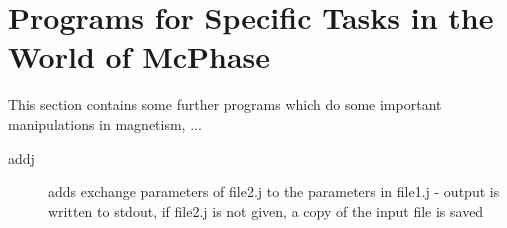 \section{Programs for Specific Tasks in the World of McPhase}\label{addprog}

This section  contains some further programs which do some important manipulations
in magnetism, ...
\begin{description} 
\item [{\prg addj}\label{addj} \addcontentsline{toc}{subsubsection}{\prg addj}
file1.j file2.j:]adds exchange parameters of file2.j to the %
parameters in
file1.j - output is written to stdout, if file2.j is not given, a copy of the input file is saved 


\end{description}
